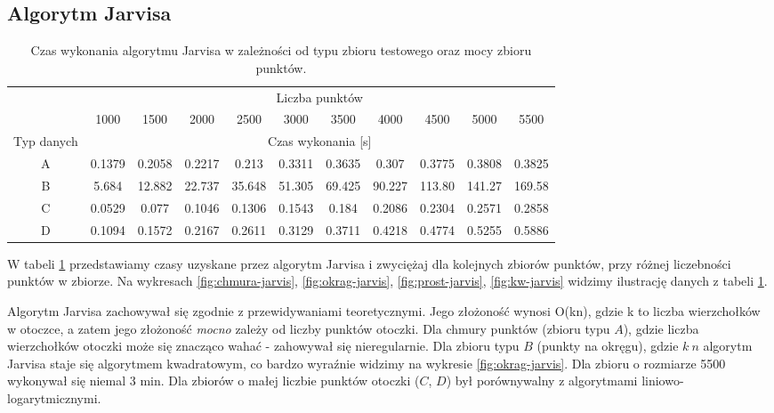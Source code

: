 \documentclass[11pt]{article}
\theoremstyle{remark} \newtheorem{definition}{def.}
\theoremstyle{definition} \newtheorem{twierdzenie}{tw.}
\begin{document}
\subsection{Algorytm Jarvisa}

\begin{table}[]
\centering
\caption{Czas wykonania algorytmu Jarvisa w zależności od typu zbioru testowego oraz mocy zbioru punktów.}
\label{tab:jarvis}
\begin{tabular}{c|c|c|c|c|c|c|c|c|c|c|}
\cline{2-11}
\multicolumn{1}{l|}{} & \multicolumn{10}{c|}{Liczba punktów} \\ \cline{2-11} 
\multicolumn{1}{l|}{} & 1000 & 1500 & 2000 & 2500 & 3000 & 3500 & 4000 & 4500 & 5000 & 5500 \\ \hline
\multicolumn{1}{|c|}{Typ danych} & \multicolumn{10}{c|}{Czas wykonania {[}s{]}} \\ \hline
\multicolumn{1}{|c|}{A} & 0.1379 & 0.2058 & 0.2217 & 0.213 & 0.3311 & 0.3635 & 0.307 & 0.3775 & 0.3808 & 0.3825 \\ \hline
\multicolumn{1}{|c|}{B} & 5.684 & 12.882 & 22.737 & 35.648 & 51.305 & 69.425 & 90.227 & 113.80 & 141.27 & 169.58 \\ \hline
\multicolumn{1}{|c|}{C} & 0.0529 & 0.077 & 0.1046 & 0.1306 & 0.1543 & 0.184 & 0.2086 & 0.2304 & 0.2571 & 0.2858 \\ \hline
\multicolumn{1}{|c|}{D} & 0.1094 & 0.1572 & 0.2167 & 0.2611 & 0.3129 & 0.3711 & 0.4218 & 0.4774 & 0.5255 & 0.5886 \\ \hline
\end{tabular}
\end{table}


W tabeli \ref{tab:jarvis} przedstawiamy czasy uzyskane przez algorytm Jarvisa i zwyciężaj dla kolejnych zbiorów punktów, przy różnej liczebności punktów w zbiorze. Na wykresach \ref{fig:chmura-jarvis}, 
\ref{fig:okrag-jarvis}, \ref{fig:prost-jarvis}, \ref{fig:kw-jarvis} widzimy ilustrację danych z tabeli \ref{tab:jarvis}.

Algorytm Jarvisa zachowywał się zgodnie z przewidywaniami teoretycznymi. Jego złożoność wynosi O(kn), gdzie k to liczba wierzchołków w otoczce, a zatem jego złożoność \emph{mocno} zależy od liczby punktów otoczki. 
Dla chmury punktów (zbioru typu $A$), gdzie liczba wierzchołków otoczki może się znacząco wahać - zahowywał się nieregularnie. 
Dla zbioru typu $B$ (punkty na okręgu), gdzie $k ~ n$ algorytm Jarvisa staje się algorytmem kwadratowym, co bardzo wyraźnie widzimy na wykresie \ref{fig:okrag-jarvis}. Dla zbioru o rozmiarze 5500 wykonywał się niemal 3 min.
Dla zbiorów o małej liczbie punktów otoczki ($C$, $D$) był porównywalny z algorytmami liniowo-logarytmicznymi. 
\end{document}
